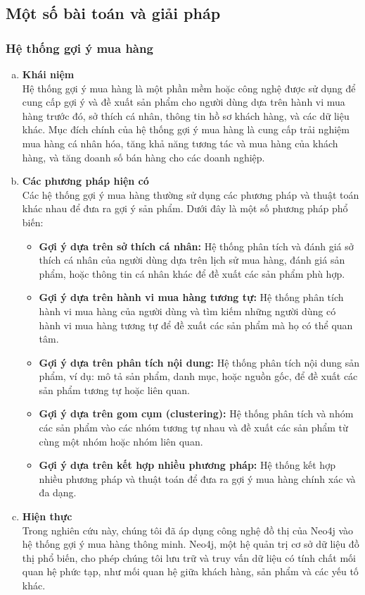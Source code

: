\subsection{Một số bài toán và giải pháp}
\subsubsection{Hệ thống gợi ý mua hàng}
\begin{enumerate}[a.]
\item \textbf{Khái niệm}\\
Hệ thống gợi ý mua hàng là một phần mềm hoặc công nghệ được sử dụng để cung cấp gợi ý và đề xuất sản phẩm cho người dùng dựa trên hành vi mua hàng trước đó, sở thích cá nhân, thông tin hồ sơ khách hàng, và các dữ liệu khác. Mục đích chính của hệ thống gợi ý mua hàng là cung cấp trải nghiệm mua hàng cá nhân hóa, tăng khả năng tương tác và mua hàng của khách hàng, và tăng doanh số bán hàng cho các doanh nghiệp.
\item \textbf{Các phương pháp hiện có}\\
Các hệ thống gợi ý mua hàng thường sử dụng các phương pháp và thuật toán khác nhau để đưa ra gợi ý sản phẩm. Dưới đây là một số phương pháp phổ biến:
\begin{itemize}
    \item \textbf{Gợi ý dựa trên sở thích cá nhân:} Hệ thống phân tích và đánh giá sở thích cá nhân của người dùng dựa trên lịch sử mua hàng, đánh giá sản phẩm, hoặc thông tin cá nhân khác để đề xuất các sản phẩm phù hợp.
    \item \textbf{Gợi ý dựa trên hành vi mua hàng tương tự:} Hệ thống phân tích hành vi mua hàng của người dùng và tìm kiếm những người dùng có hành vi mua hàng tương tự để đề xuất các sản phẩm mà họ có thể quan tâm.
    \item \textbf{Gợi ý dựa trên phân tích nội dung:}  Hệ thống phân tích nội dung sản phẩm, ví dụ: mô tả sản phẩm, danh mục, hoặc nguồn gốc, để đề xuất các sản phẩm tương tự hoặc liên quan.
    \item \textbf{Gợi ý dựa trên gom cụm (clustering): }Hệ thống phân tích và nhóm các sản phẩm vào các nhóm tương tự nhau và đề xuất các sản phẩm từ cùng một nhóm hoặc nhóm liên quan.
    \item \textbf{Gợi ý dựa trên kết hợp nhiều phương pháp:} Hệ thống kết hợp nhiều phương pháp và thuật toán để đưa ra gợi ý mua hàng chính xác và đa dạng.
\end{itemize}
\item \textbf{Hiện thực}\\
Trong nghiên cứu này, chúng tôi đã áp dụng công nghệ đồ thị của Neo4j vào hệ thống gợi ý mua hàng thông minh. Neo4j, một hệ quản trị cơ sở dữ liệu đồ thị phổ biến, cho phép chúng tôi lưu trữ và truy vấn dữ liệu có tính chất mối quan hệ phức tạp, như mối quan hệ giữa khách hàng, sản phẩm và các yếu tố khác.


\end{enumerate}
